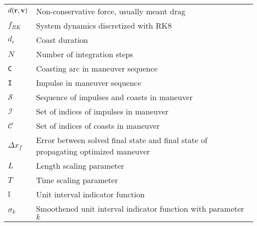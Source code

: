 \begin{longtable}{ll}
\(d(\mathbf{r}, \mathbf{v})\) & Non-conservative force, usually meant drag \\
\(f_{RK}\) & System dynamics discretized with RK8 \\
\(d_c\) & Coast duration \\
\(N\) & Number of integration steps \\
\texttt{C} & Coasting arc in maneuver sequence \\
\texttt{I} & Impulse in maneuver sequence \\
\(\mathcal{S}\) & Sequence of impulses and coasts in maneuver \\
\(\mathcal{I}\) & Set of indices of impulses in maneuver \\
\(\mathcal{C}\) & Set of indices of coasts in maneuver \\
\(\Delta x_f\) & Error between solved final state and final state of propagating optimized maneuver \\
\(L\) & Length scaling parameter \\
\(T\) & Time scaling parameter \\
\(\mathbb{I}\) & Unit interval indicator function \\
\(\sigma_k\) & Smoothened unit interval indicator function with parameter \(k\) \\
\end{longtable}

